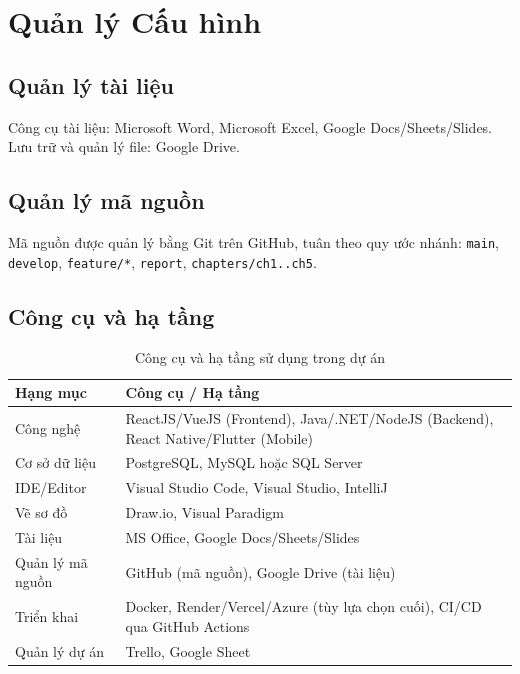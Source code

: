 \section{Quản lý Cấu hình}

\subsection{Quản lý tài liệu}
Công cụ tài liệu: Microsoft Word, Microsoft Excel, Google Docs/Sheets/Slides.\\
Lưu trữ và quản lý file: Google Drive.

\subsection{Quản lý mã nguồn}
Mã nguồn được quản lý bằng Git trên GitHub, tuân theo quy ước nhánh: \texttt{main}, \texttt{develop}, \texttt{feature/*}, \texttt{report}, \texttt{chapters/ch1..ch5}.

\subsection{Công cụ và hạ tầng}
\begin{table}[htbp]
    \centering
    \small
    \caption{Công cụ và hạ tầng sử dụng trong dự án}
    \begin{tabular}{|p{3.5cm}|p{9cm}|}
        \hline
        \textbf{Hạng mục} & \textbf{Công cụ / Hạ tầng} \\
        \hline
        Công nghệ & ReactJS/VueJS (Frontend), Java/.NET/NodeJS (Backend), React Native/Flutter (Mobile) \\
        \hline
        Cơ sở dữ liệu & PostgreSQL, MySQL hoặc SQL Server \\
        \hline
        IDE/Editor & Visual Studio Code, Visual Studio, IntelliJ \\
        \hline
        Vẽ sơ đồ & Draw.io, Visual Paradigm \\
        \hline
        Tài liệu & MS Office, Google Docs/Sheets/Slides \\
        \hline
        Quản lý mã nguồn & GitHub (mã nguồn), Google Drive (tài liệu) \\
        \hline
        Triển khai & Docker, Render/Vercel/Azure (tùy lựa chọn cuối), CI/CD qua GitHub Actions \\
        \hline
        Quản lý dự án & Trello, Google Sheet \\
        \hline
    \end{tabular}
\end{table}